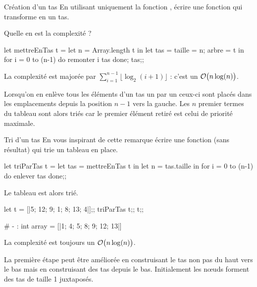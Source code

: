 \begin{exo}{Création d'un tas}{}
En utilisant uniquement la fonction , écrire une fonction qui transforme  en un tas.

Quelle en est la complexité ?
\reponse
\begin{ocaml}
let mettreEnTas t =
  let n = Array.length t in
  let tas = {taille = n; arbre = t} in
  for i = 0 to (n-1) do remonter i tas done;
  tas;;
\end{ocaml}

La complexité est majorée par $\displaystyle \sum_{i=1}^{n-1} \lfloor\log_2(i+1)\rfloor$ : c'est un ${\cal O}\bigl(n\log(n)\bigr)$.
\end{exo}
Lorsqu'on en enlève tous les éléments d'un tas un par un ceux-ci sont placés dans les emplacements depuis la position $n-1$ vers la gauche. Les $n$ premier termes du tableau sont alors triés car le premier élément retiré est celui de priorité maximale.
\begin{exo}{Tri d'un tas}{}
En vous inspirant de cette remarque écrire une fonction (sans résultat) qui trie un tableau en place.
\reponse

\begin{ocaml}
let triParTas t =
  let tas = mettreEnTas t in
  let n = tas.taille in
  for i = 0 to (n-1) do enlever tas done;;
\end{ocaml}

Le tableau  est alors trié.

\begin{ocaml}
let t = [|5; 12; 9; 1; 8; 13; 4|];;
triParTas t;;
t;;

# - : int array = [|1; 4; 5; 8; 9; 12; 13|]
\end{ocaml}
La complexité est toujours un ${\cal O}\bigl(n\log(n)\bigr)$.
\end{exo}
La première étape peut être améliorée en construisant le tas non pas du haut vers le bas  mais en construisant des tas depuis le bas. Initialement les nœuds forment des tas de taille 1 juxtaposés.

